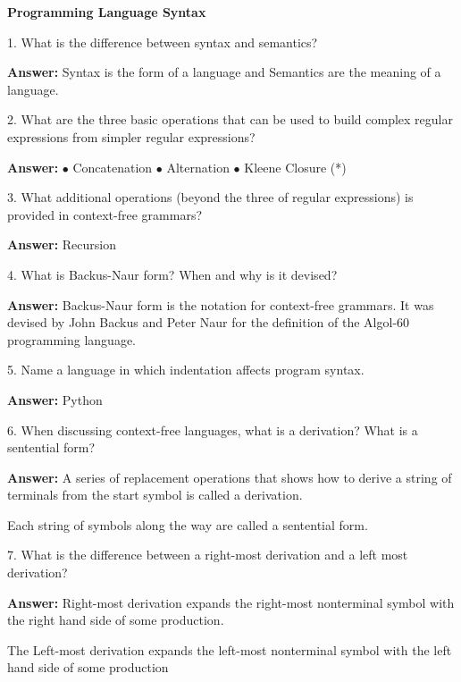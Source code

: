 \centerline{\bf Programming Language Syntax}

\vskip 1cm

1. What is the difference between syntax and semantics?

\vskip 3mm
{\bf Answer:} Syntax is the form of a language and Semantics are the meaning of a language.

\filbreak
\vskip 1cm

2. What are the three basic operations that can be used to build complex regular expressions from simpler regular expressions?

\vskip 3mm
{\bf Answer:} 
\vskip 1mm
\qquad$\bullet$ Concatenation
\vskip 1mm
\qquad$\bullet$ Alternation
\vskip 1mm
\qquad$\bullet$ Kleene Closure (*)

\filbreak
\vskip 1cm

3. What additional operations (beyond the three of regular expressions) is provided in context-free grammars?

\vskip 3mm
{\bf Answer:} Recursion

\filbreak
\vskip 1cm

4. What is Backus-Naur form? When and why is it devised?

\vskip 3mm
{\bf Answer:} Backus-Naur form is the notation for context-free grammars. It was devised by John Backus and Peter Naur for the definition of  the Algol-60 programming language.

\filbreak
\vskip 1cm

5. Name a language in which indentation affects program syntax.

\vskip 3mm
{\bf Answer:} Python

\filbreak
\vskip 1cm

6. When discussing context-free languages, what is a derivation? What is a sentential form?

\vskip 3mm
{\bf Answer:} A series of replacement operations that shows how to derive a string of terminals from the start symbol is called a derivation.

\vskip 2mm
Each string of symbols along the way are called a sentential form.

\filbreak
\vskip 1cm

7. What is the difference between a right-most derivation and a left most derivation?

\vskip 3mm
{\bf Answer:} Right-most derivation expands the right-most nonterminal symbol with the right hand side of some production.

\vskip 2mm
The Left-most derivation expands the left-most nonterminal symbol with the left hand side of some production

